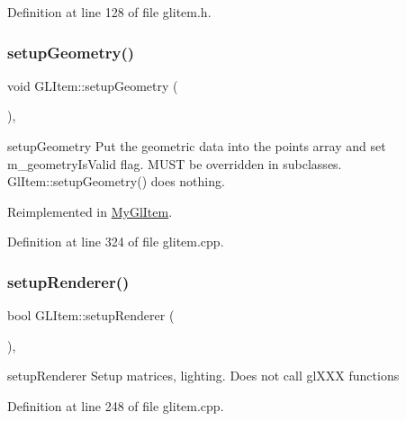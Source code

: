 Definition at line 128 of file glitem.\+h.

\mbox{\label{class_g_l_item_a74269f515d4d025149cc8a603d8c66f1}} 
\subsubsection{\texorpdfstring{setupGeometry()}{setupGeometry()}}
{\footnotesize\ttfamily void G\+L\+Item\+::setup\+Geometry (\begin{DoxyParamCaption}{ }\end{DoxyParamCaption})\hspace{0.3cm}{\ttfamily [protected]}, {\ttfamily [virtual]}}



setup\+Geometry Put the geometric data into the points array and set m\+\_\+geometry\+Is\+Valid flag. M\+U\+ST be overridden in subclasses. Gl\+Item\+::setup\+Geometry() does nothing. 



Reimplemented in \mbox{\hyperlink{class_my_gl_item_a27704a445b6915b4f365193bf0cab618}{My\+Gl\+Item}}.



Definition at line 324 of file glitem.\+cpp.

\mbox{\label{class_g_l_item_a026f429130712bff4517c1cf9af910fd}} 
\subsubsection{\texorpdfstring{setupRenderer()}{setupRenderer()}}
{\footnotesize\ttfamily bool G\+L\+Item\+::setup\+Renderer (\begin{DoxyParamCaption}{ }\end{DoxyParamCaption})\hspace{0.3cm}{\ttfamily [protected]}, {\ttfamily [virtual]}}



setup\+Renderer Setup matrices, lighting. Does not call gl\+X\+XX functions 



Definition at line 248 of file glitem.\+cpp.

\mbox{\label{class_g_l_item_a3b5a6427cdafb5adb6aeef1c644bb933}} 
